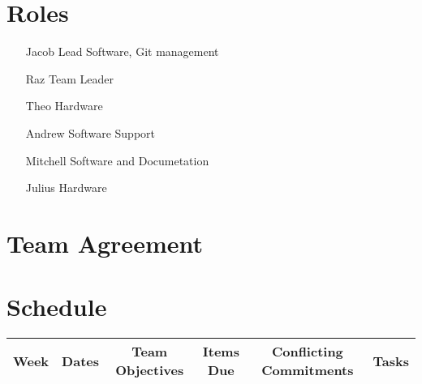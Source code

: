 \documentclass[paper=a4, fontsize=11pt]{scrartcl} %
\begin{document}
\section*{Roles}
\begin{itemize}
    \item[Jacob] Lead Software, Git management
    \item[Raz] Team Leader
    \item[Theo] Hardware
    \item[Andrew] Software Support
    \item[Mitchell] Software and Documetation
    \item[Julius] Hardware
\end{itemize}
\section*{Team Agreement}
\section*{Schedule}
\begin{sideways}
    \begin{tabular}{|c|c|c|c|c|c|}
        \hline
        \textbf{Week} & \textbf{Dates} & \textbf{Team Objectives} & \textbf{Items Due} &
        \textbf{Conflicting Commitments} & \textbf{Tasks} \\ \hline \hline
    \end{tabular}
\end{sideways}
\end{document}
